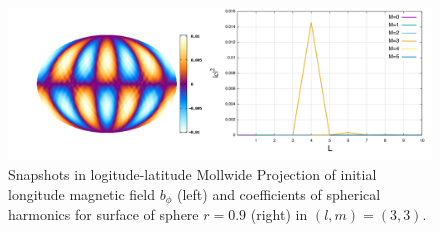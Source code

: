 \documentclass[12pt]{jsarticle}
\begin{document}
\begin{figure}[H]
\centering
\includegraphics[height=1.0\textheight,width=1.0\hsize,angle=0,keepaspectratio]{./Image/b0p_L3M3.png}
\caption{Snapshots in logitude-latitude Mollwide Projection of initial longitude magnetic field $b_\phi$ (left) and coefficients of spherical harmonics for surface of sphere $r=0.9$ (right) in $(l,m)=(3,3)$.  }\label{b0p_L3M3}
\end{figure}


\end{document}
